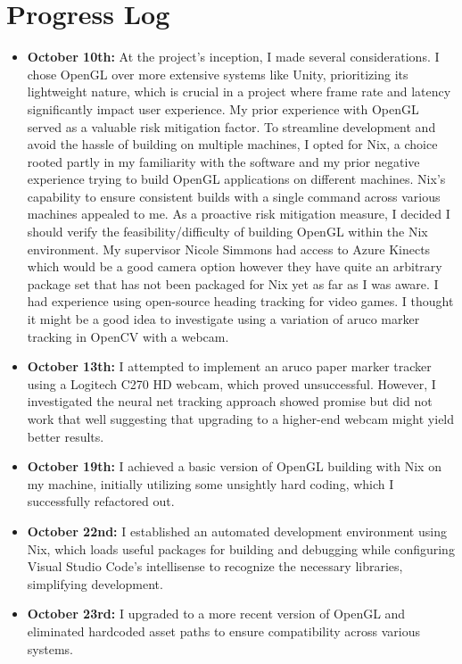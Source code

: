 \section{Progress Log}
\begin{itemize}
    \item \textbf{October 10th:} At the project's inception, I made several considerations. I chose OpenGL over more extensive systems like Unity, prioritizing its lightweight nature, which is crucial in a project where frame rate and latency significantly impact user experience. My prior experience with OpenGL served as a valuable risk mitigation factor. To streamline development and avoid the hassle of building on multiple machines, I opted for Nix, a choice rooted partly in my familiarity with the software and my prior negative experience trying to build OpenGL applications on different machines. Nix's capability to ensure consistent builds with a single command across various machines appealed to me. As a proactive risk mitigation measure, I decided I should verify the feasibility/difficulty of building OpenGL within the Nix environment. My supervisor Nicole Simmons had access to Azure Kinects which would be a good camera option however they have quite an arbitrary package set that has not been packaged for Nix yet as far as I was aware. I had experience using open-source heading tracking for video games. I thought it might be a good idea to investigate using a variation of aruco marker
          tracking in OpenCV with a webcam.

    \item \textbf{October 13th:} I attempted to implement an aruco paper marker tracker using a Logitech C270 HD webcam, which proved unsuccessful. However, I investigated the neural net tracking approach showed promise but did not work that well suggesting that upgrading to a higher-end webcam might yield better results.

    \item \textbf{October 19th:} I achieved a basic version of OpenGL building with Nix on my machine, initially utilizing some unsightly hard coding, which I successfully refactored out.

    \item \textbf{October 22nd:} I established an automated development environment using Nix, which loads useful packages for building and debugging while configuring Visual Studio Code's intellisense to recognize the necessary libraries, simplifying development.

    \item \textbf{October 23rd:} I upgraded to a more recent version of OpenGL and eliminated hardcoded asset paths to ensure compatibility across various systems.


\end{itemize}
